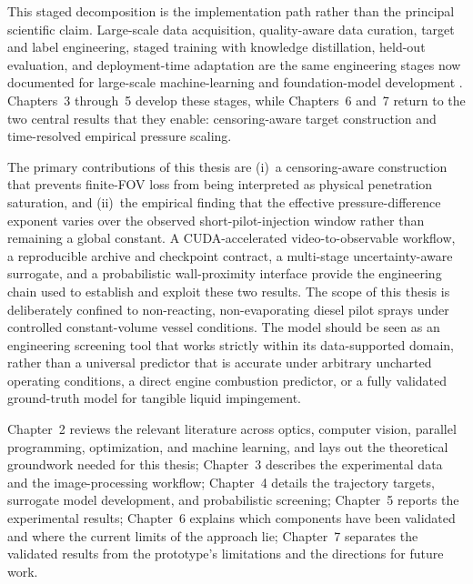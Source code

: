 This staged decomposition is the implementation path rather than the principal scientific claim. Large-scale data acquisition, quality-aware data curation, target and label engineering, staged training with knowledge distillation, held-out evaluation, and deployment-time adaptation are the same engineering stages now documented for large-scale machine-learning and foundation-model development \cite{Zhao2023LLMSurvey,Bommasani2021FoundationModels}. Chapters~3 through~5 develop these stages, while Chapters~6 and~7 return to the two central results that they enable: censoring-aware target construction and time-resolved empirical pressure scaling.

The primary contributions of this thesis are (i)~a censoring-aware construction that prevents finite-FOV loss from being interpreted as physical penetration saturation, and (ii)~the empirical finding that the effective pressure-difference exponent varies over the observed short-pilot-injection window rather than remaining a global constant. A CUDA-accelerated video-to-observable workflow, a reproducible archive and checkpoint contract, a multi-stage uncertainty-aware surrogate, and a probabilistic wall-proximity interface provide the engineering chain used to establish and exploit these two results.
The scope of this thesis is deliberately confined to non-reacting, non-evaporating diesel pilot sprays under controlled constant-volume vessel conditions.
The model should be seen as an engineering screening tool that works strictly within its data-supported domain, rather than a universal predictor that is accurate under arbitrary uncharted operating conditions, a direct engine combustion predictor, or a fully validated ground-truth model for tangible liquid impingement.

Chapter~2 reviews the relevant literature across optics, computer vision, parallel programming, optimization, and machine learning, and lays out the theoretical groundwork needed for this thesis;
Chapter~3 describes the experimental data and the image-processing workflow;
Chapter~4 details the trajectory targets, surrogate model development, and probabilistic screening;
Chapter~5 reports the experimental results;
Chapter~6 explains which components have been validated and where the current limits of the approach lie;
Chapter~7 separates the validated results from the prototype's limitations and the directions for future work.
